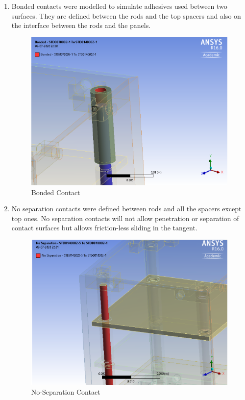 \documentclass[../../main.tex]{subfiles}
\begin{document}
\begin{enumerate}
        \item Bonded contacts were modelled to simulate adhesives used between two surfaces. They are defined between the rods and the top spacers and also on the interface between the rods and the panels.
        \begin{figure}[H]
        \centering
        \includegraphics[scale=0.5]{Figures/Mechanical/bonded_contact.png}
        \caption{Bonded Contact}
        \label{fig:sys_CAD}
    \end{figure}
        \item No separation contacts were defined between rods and all the spacers except top ones. No separation contacts will not allow penetration or separation of contact surfaces but allows friction-less sliding in the tangent.
        \begin{figure}[H]
        \centering
        \includegraphics[scale=0.45]{Figures/Mechanical/nosep.png}
        \caption{No-Separation Contact}
        \label{fig:sys_CAD}
    \end{figure}
    \end{enumerate}
\end{document}
